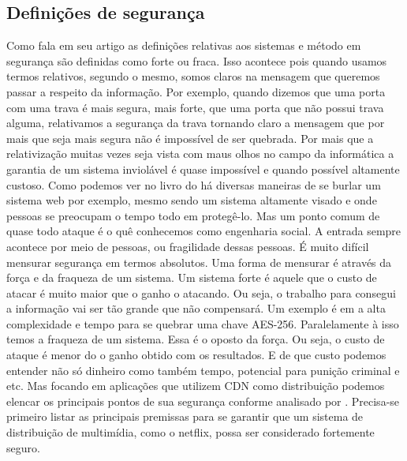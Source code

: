 \subsection{Defini\c{c}\~oes de seguran\c{c}a}
\label{subsection:definicoes_seguranca}
Como \cite{o2003comparing} fala em seu artigo as defini\c{c}\~oes relativas aos sistemas e m\'etodo em seguran\c{c}a s\~ao definidas como forte ou fraca. Isso acontece pois quando usamos termos relativos, segundo o mesmo, somos claros na mensagem que queremos passar a respeito da informa\c{c}\~ao. Por exemplo, quando dizemos que uma porta com uma trava \'e mais segura, mais forte, que uma porta que n\~ao possui trava alguma, relativamos a seguran\c{c}a da trava tornando claro a mensagem que por mais que seja mais segura n\~ao \'e imposs\'ivel de ser quebrada.
\newline
Por mais que a relativiza\c{c}\~ao muitas vezes seja vista com maus olhos no campo da inform\'atica a garantia de um sistema inviol\'avel \'e quase imposs\'ivel e quando poss\'ivel altamente custoso. 
\newline
Como podemos ver no livro do \cite{stuttard2011web} h\'a diversas maneiras de se burlar um sistema web por exemplo, mesmo sendo um sistema altamente visado e onde pessoas se preocupam o tempo todo em proteg\^e-lo. Mas um ponto comum de quase todo ataque \'e o qu\^e conhecemos como engenharia social. A entrada sempre acontece por meio de pessoas, ou fragilidade dessas pessoas.
\newline
\'E muito dif\'icil mensurar seguran\c{c}a em termos absolutos. Uma forma de mensurar \'e atrav\'es da for\c{c}a e da fraqueza de um sistema. Um sistema forte \'e aquele que o custo de atacar \'e muito maior que o ganho o atacando. Ou seja, o trabalho para consegui a informa\c{c}\~ao vai ser t\~ao grande que n\~ao compensar\'a. Um exemplo \'e em \cite{biryukov2010key} a alta complexidade e tempo para se quebrar uma chave AES-256.
\newline
Paralelamente \`a isso temos a fraqueza de um sistema. Essa \'e o oposto da for\c{c}a. Ou seja, o custo de ataque \'e menor do o ganho obtido com os resultados. E de que custo podemos entender n\~ao s\'o dinheiro como tamb\'em tempo, potencial para puni\c{c}\~ao criminal e etc.
\newline
Mas focando em aplica\c{c}\~oes que utilizem CDN como distribui\c{c}\~ao podemos elencar os principais pontos de sua seguran\c{c}a conforme analisado por \cite{pomelo2009analysis}.
\newline
Precisa-se primeiro listar as principais premissas para se garantir que um sistema de distribui\c{c}\~ao de multim\'idia, como o netflix, possa ser considerado fortemente seguro.
